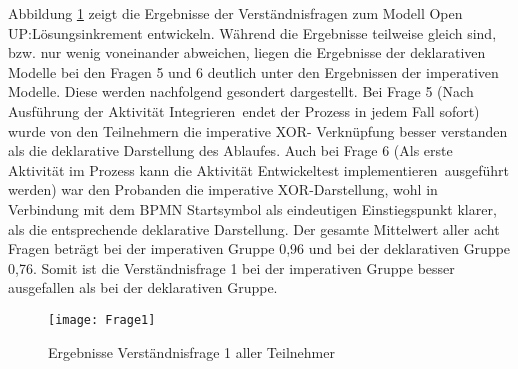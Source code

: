 Abbildung \ref{fig:Frage1} zeigt die Ergebnisse der Verständnisfragen zum Modell \grqq Open UP:Lösungsinkrement entwickeln\grqq. Während die Ergebnisse teilweise gleich sind, bzw. nur wenig voneinander abweichen, liegen die Ergebnisse der deklarativen Modelle bei den Fragen 5 und 6 deutlich unter den Ergebnissen der imperativen Modelle. Diese werden nachfolgend gesondert dargestellt. \newline
Bei Frage 5 (\grqq Nach Ausführung der Aktivität \grqq Integrieren\grqq \ endet der Prozess in jedem Fall sofort\grqq) wurde von den Teilnehmern die imperative XOR- Verknüpfung besser verstanden als die deklarative Darstellung des Ablaufes. Auch bei Frage 6 (\grqq Als erste Aktivität im Prozess kann die Aktivität \grqq Entwickeltest implementieren\grqq \ ausgeführt werden\grqq) war den Probanden die imperative XOR-Darstellung, wohl in Verbindung mit dem BPMN Startsymbol als eindeutigen Einstiegspunkt klarer, als die entsprechende deklarative Darstellung.\newline
Der gesamte Mittelwert aller acht Fragen beträgt bei der imperativen Gruppe 0,96 und bei der deklarativen Gruppe 0,76. Somit ist die Verständnisfrage 1 bei der imperativen Gruppe besser ausgefallen als bei der deklarativen Gruppe. \newline

\begin{figure}[htp]
\begin{center}
  \texttt{[image: Frage1]} %
  \caption{Ergebnisse Verständnisfrage 1 aller Teilnehmer}
  \label{fig:Frage1}
\end{center}
\end{figure}


